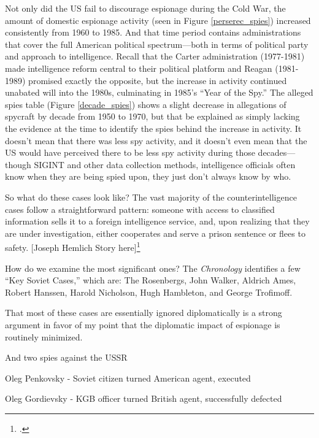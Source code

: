 \documentclass[11pt]{memoir}
\begin{document}
\begin{refsegment}
Not only did the US fail to discourage espionage during the Cold War, the amount of domestic espionage activity (seen in Figure \ref{perserec_spies}) increased consistently from 1960 to 1985. And that time period contains administrations that cover the full American political spectrum---both in terms of political party and approach to intelligence. Recall that the Carter administration (1977-1981) made intelligence reform central to their political platform and Reagan (1981-1989) promised exactly the opposite, but the increase in activity continued unabated will into the 1980s, culminating in 1985's ``Year of the Spy.'' The alleged spies table (Figure \ref{decade_spies}) shows a slight decrease in allegations of spycraft by decade from 1950 to 1970, but that be explained as simply lacking the evidence at the time to identify the spies behind the increase in activity. It doesn't mean that there was less spy activity, and it doesn't even mean that the US would have perceived there to be less spy activity during those decades---though SIGINT and other data collection methods, intelligence officials often know when they are being spied upon, they just don't always know by who.

So what do these cases look like? The vast majority of the counterintelligence cases follow a straightforward pattern: someone with access to classified information sells it to a foreign intelligence service, and, upon realizing that they are under investigation, either cooperates and serve a prison sentence or flees to safety. [Joseph Hemlich Story here]\footcite{upi_ex-army_1981}

How do we examine the most significant ones? The \emph{Chronology} identifies a few ``Key Soviet Cases,'' which are: The Rosenbergs, John Walker, Aldrich Ames, Robert Hanssen, Harold Nicholson, Hugh Hambleton, and George Trofimoff.

That most of these cases are essentially ignored diplomatically is a strong argument in favor of my point that the diplomatic impact of espionage is routinely minimized.

And two spies against the USSR

Oleg Penkovsky - Soviet citizen turned American agent, executed

Oleg Gordievsky - KGB officer turned British agent, successfully defected



\end{refsegment}
\end{document}
